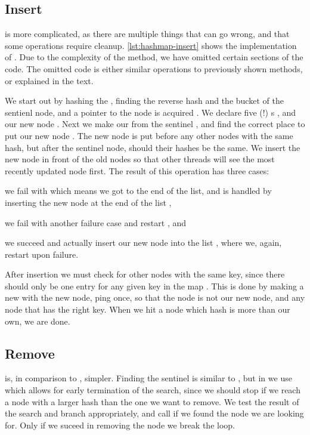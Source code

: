 \subsection{Insert}
 is more complicated, as there are multiple things that can go wrong, and
that some operations require cleanup. \cref{lst:hashmap-insert} shows the implementation of
. Due to the complexity of the method, we have omitted certain sections of the code.
The omitted code is either similar operations to previously shown methods, or explained in the
text.



We start out by hashing the , finding the reverse hash  and the bucket of
the sentienl node, and a pointer to the node is acquired . We declare five (!)
s , and  our new node .
Next we make our  from the sentinel , and find the correct place to put
our new node . The new node is put before any other nodes with the same hash, but
after the sentinel node, should their hashes be the same. We insert the new node in front of the
old nodes so that other threads will see the most recently updated node first. The result of this
operation has three cases:
\begin{enumerate*}[1) ]
  \item we fail with  which means we got to the end of the list, and is handled by
    inserting the new node at the end of the list  ,
  \item we fail with another failure case and restart , and
  \item we succeed and actually insert our new node into the list , where we, again,
    restart upon failure.
\end{enumerate*}

After insertion we must check for other nodes with the same key, since there should only be one
entry for any given key in the map . This is done by making a new  with
the new node, ping once, so that the  node is not our new node, and
 any node that has the right key.  When we hit a node which hash is more than our
own, we are done.


\subsection{Remove}
 is, in comparison to , simpler.
Finding the sentinel is similar to  , but in  we use
 which allows for early termination of the search, since we should stop if we
reach a node with a larger hash than the one we want to remove. We test the result of the search
 and branch appropriately, and call   if we found
the node we are looking for. Only if we suceed in removing the node we break the loop.

